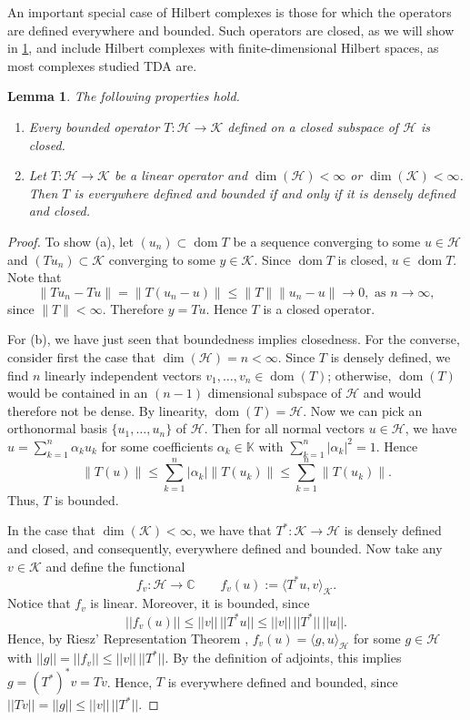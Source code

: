 \documentclass[11pt]{article}
\newtheorem{lemma}[theorem]{Lemma}
\theoremstyle{definition}
\theoremstyle{remark}
\DeclareMathOperator\dom{dom}
\newcommand{\Hh}{\mathcal{H}}
\newcommand{\Kk}{\mathcal{K}}
\newcommand{\IK}{\mathbb{K}}
\newcommand{\IC}{\mathbb{C}}
\begin{document}
An important special case of Hilbert complexes is those for which the operators are defined everywhere and bounded. Such operators are closed, as we will show in \cref{lem:bdopclosed}, and include Hilbert complexes with finite-dimensional Hilbert spaces, as most complexes studied TDA are.

\begin{lemma} \label{lem:bdopclosed}
The following properties hold.
\begin{enumerate}
    \item[(a)] Every bounded operator $T:\Hh \to \Kk$ defined on a closed subspace of $\mathcal{H}$ is closed.
    \item[(b)] Let $T:\Hh \rightarrow \Kk$ be a linear operator and $\dim(\Hh)<\infty$ or $\dim(\Kk)<\infty$. Then $T$ is everywhere defined and bounded if and only if it is densely defined and closed.
\end{enumerate}
\end{lemma}

\begin{proof}
    To show (a), let $(u_n)\subset \dom T$ be a sequence converging to some $u\in \mathcal{H}$ and $(Tu_n)\subset \mathcal{K}$ converging to some $y\in \mathcal{K}$. Since $\dom T$ is closed, $u \in \dom T$. Note that
$$\|Tu_n-Tu\| = \|T(u_n-u)\| \leq \|T\|\|u_n-u\| \to 0, \text{ as }n\to \infty,$$
since $\|T\|<\infty.$ Therefore $y=Tu$. Hence $T$ is a closed operator.

For (b), we have just seen that boundedness implies closedness. For the converse, consider first the case that $\dim(\Hh)=n<\infty$. Since $T$ is densely defined, we find $n$ linearly independent vectors $v_1,\dots,v_n \in \dom(T)$; otherwise, $\dom(T)$ would be contained in an $(n-1)$ dimensional subspace of $\Hh$ and would therefore not be dense. By linearity, $\dom(T)=\Hh$. Now we can pick an orthonormal basis $\{u_1,\dots,u_n\}$ of $\Hh$. Then for all normal vectors $u \in \Hh$, we have $u=\sum_{k=1}^n \alpha_k u_k$ for some coefficients $\alpha_k \in \IK$ with $\sum_{k=1}^n |\alpha_k|^2 = 1$. Hence 
$$
\|T(u)\|\le \sum_{k=1}^n |\alpha_k|\|T(u_k)\| \le \sum_{k=1}^n \|T(u_k)\|.
$$
Thus, $T$ is bounded.

In the case that $\dim(\Kk)<\infty$, we have that $T^*:\Kk \rightarrow \Hh$ is densely defined and closed, and consequently, everywhere defined and bounded. Now take any $v \in \Kk$ and define the functional 
$$
f_v:\Hh \rightarrow \IC \qquad f_v(u):=\langle T^*u,v\rangle_\Kk.
$$
Notice that $f_v$ is linear. Moreover, it is bounded, since 
$$
||f_v(u)|| \le ||v|| \, ||T^* u|| \le ||v||\, ||T^*|| \, ||u||.
$$
Hence, by Riesz' Representation Theorem \citep[p.~90]{yosida}, $f_v(u)=\langle g,u\rangle_{\Hh}$ for some $g \in \Hh$ with $||g||=||f_v||\le ||v||\,||T^*||$. By the definition of adjoints, this implies $g=(T^*)^* v = Tv$. Hence, $T$ is everywhere defined and bounded, since $||Tv||=||g||\le ||v||\,||T^*||$.
\end{proof}
 
\end{document}
